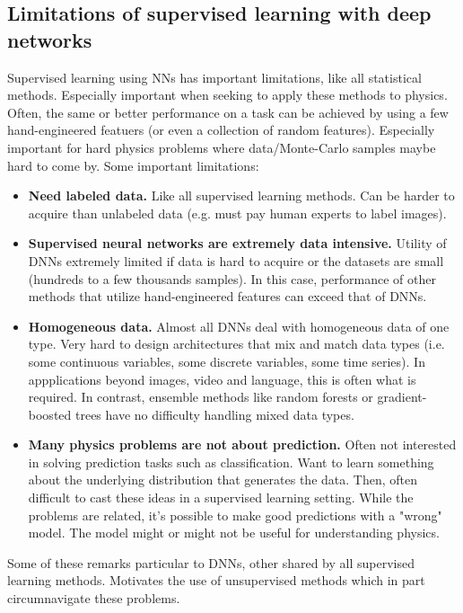 \documentclass[norsk,a4paper,11pt]{article}
\begin{document}
\subsection{Limitations of supervised learning with deep networks}
Supervised learning using NNs has important limitations, like all statistical methods. Especially important when seeking to apply these methods to physics. Often, the same or better performance on a task can be achieved by using a few hand-engineered featuers (or even a collection of random features). Especially important for hard physics problems where data/Monte-Carlo samples maybe hard to come by. Some important limitations:
\begin{itemize}
	\item \textbf{Need labeled data.}
	Like all supervised learning methods. Can be harder to acquire than unlabeled data (e.g. must pay human experts to label images).
	\item \textbf{Supervised neural networks are extremely data intensive.}
	Utility of DNNs extremely limited if data is hard to acquire or the datasets are small (hundreds to a few thousands samples). In this case, performance of other methods that utilize hand-engineered features can exceed that of DNNs.
	\item \textbf{Homogeneous data.}
	Almost all DNNs deal with homogeneous data of one type. Very hard to design architectures that mix and match data types (i.e. some continuous variables, some discrete variables, some time series). In appplications beyond images, video and language, this is often what is required. In contrast, ensemble methods like random forests or gradient-boosted trees have no difficulty handling mixed data types.
	\item \textbf{Many physics problems are not about prediction.}
	Often not interested in solving prediction tasks such as classification. Want to learn something about the underlying distribution that generates the data. Then, often difficult to cast these ideas in a supervised learning setting. While the problems are related, it's possible to make good predictions with a "wrong" model. The model might or might not be useful for understanding physics.
\end{itemize}
Some of these remarks particular to DNNs, other shared by all supervised learning methods. Motivates the use of unsupervised methods which in part circumnavigate these problems.
\end{document}
